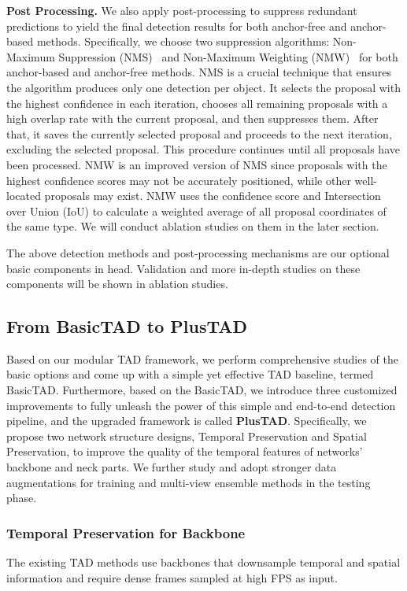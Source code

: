 \documentclass[a4paper,fleqn]{cas-dc}
\begin{document}
\textbf{Post Processing.}
We also apply post-processing to suppress redundant predictions to yield the final detection results for both anchor-free and anchor-based methods. Specifically, we choose two suppression algorithms: Non-Maximum Suppression (NMS)~\citep{nms} and Non-Maximum Weighting (NMW)~\citep{nmw} for both anchor-based and anchor-free methods. NMS is a crucial technique that ensures the algorithm produces only one detection per object. It selects the proposal with the highest confidence in each iteration, chooses all remaining proposals with a high overlap rate with the current proposal, and then suppresses them. After that, it saves the currently selected proposal and proceeds to the next iteration, excluding the selected proposal. This procedure continues until all proposals have been processed. NMW is an improved version of NMS since proposals with the highest confidence scores may not be accurately positioned, while other well-located proposals may exist. NMW uses the confidence score and Intersection over Union (IoU) to calculate a weighted average of all proposal coordinates of the same type. We will conduct ablation studies on them in the later section.


The above detection methods and post-processing mechanisms are our optional basic components in head.
Validation and more in-depth studies on these components will be shown in ablation studies.

\subsection{From BasicTAD to PlusTAD}
\label{frombasictadtobasictadplus}
Based on our modular TAD framework, we perform comprehensive studies of the basic options and come up with a simple yet effective TAD baseline, termed BasicTAD.
Furthermore, based on the BasicTAD, we introduce three customized improvements to fully unleash the power of this simple and end-to-end detection pipeline, and the upgraded framework is called \textbf{PlusTAD}.
Specifically, we propose two network structure designs, Temporal Preservation and Spatial Preservation, to improve the quality of the temporal features of networks' backbone and neck parts.
We further study and adopt stronger data augmentations for training and multi-view ensemble methods in the testing phase.

\subsubsection{Temporal Preservation for Backbone}
\label{temporalpreservationforbackbone}
The existing TAD methods use backbones that downsample temporal and spatial information and require dense frames sampled at high FPS as input.
\end{document}
